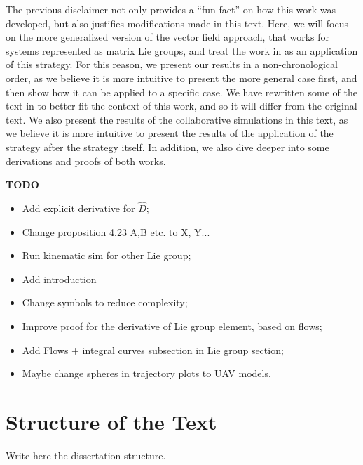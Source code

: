 The previous disclaimer not only provides a ``fun fact'' on how this work was developed, but also justifies modifications made in this text. Here, we will focus on the more generalized version of the vector field approach, that works for systems represented as matrix Lie groups, and treat the work in \citet{Pessoa2024} as an application of this strategy. For this reason, we present our results in a non-chronological order, as we believe it is more intuitive to present the more general case first, and then show how it can be applied to a specific case. We have rewritten some of the text in \citet{Pessoa2024} to better fit the context of this work, and so it will differ from the original text. We also present the results of the collaborative simulations in this text, as we believe it is more intuitive to present the results of the application of the strategy after the strategy itself. In addition, we also dive deeper into some derivations and proofs of both works.

\textbf{TODO}
\begin{itemize}
    \item Add explicit derivative for $\widehat{D}$;
    \item Change proposition 4.23 A,B etc. to X, Y...
    \item Run kinematic sim for other Lie group;
    \item Add introduction
    \item Change symbols to reduce complexity;
    \item Improve proof for the derivative of Lie group element, based on flows;
    \item Add Flows + integral curves subsection in Lie group section;
    \item Maybe change spheres in trajectory plots to UAV models.
\end{itemize}

\section{Structure of the Text}

Write here the dissertation structure.

